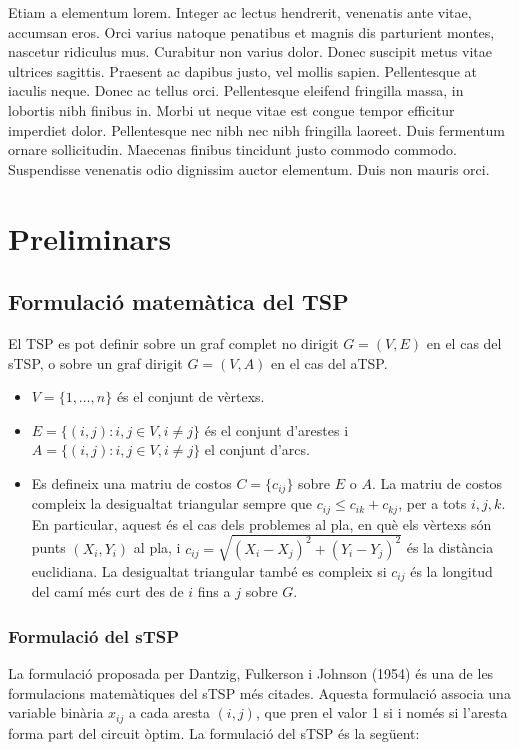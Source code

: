 \documentclass[a4paper,12pt,twoside]{ThesisStyle}
\begin{document}
Etiam a elementum lorem. Integer ac lectus hendrerit, venenatis ante vitae, accumsan eros. Orci varius natoque penatibus et magnis dis parturient montes, nascetur ridiculus mus. Curabitur non varius dolor. Donec suscipit metus vitae ultrices sagittis. Praesent ac dapibus justo, vel mollis sapien. Pellentesque at iaculis neque. Donec ac tellus orci. Pellentesque eleifend fringilla massa, in lobortis nibh finibus in. Morbi ut neque vitae est congue tempor efficitur imperdiet dolor. Pellentesque nec nibh nec nibh fringilla laoreet. Duis fermentum ornare sollicitudin. Maecenas finibus tincidunt justo commodo commodo. Suspendisse venenatis odio dignissim auctor elementum. Duis non mauris orci.



\chapter{Preliminars}
\label{cap:prelim}

\section{Formulació matemàtica del TSP}
\label{Formulacio}

El TSP es pot definir sobre un graf complet no dirigit \( G = (V, E) \) en el cas del sTSP, o sobre un graf dirigit \( G = (V, A) \) en el cas del aTSP.

\begin{itemize}
  \item \( V = \{1, \dots, n\} \) és el conjunt de vèrtexs.
  \item \( E = \{ (i,j) : i,j \in V, i \neq j \} \) és el conjunt d'arestes i \( A = \{ (i,j) : i,j \in V, i \neq j \} \) el conjunt d'arcs.
  \item Es defineix una matriu de costos \( C = \{c_{ij}\} \) sobre \( E \) o \( A \). La matriu de costos compleix la desigualtat triangular sempre que \( c_{ij} \leq c_{ik} + c_{kj} \), per a tots \( i, j, k \). En particular, aquest és el cas dels problemes al pla, en què els vèrtexs són punts \( (X_i, Y_i) \) al pla, i \( c_{ij} = \sqrt{(X_i - X_j)^2 + (Y_i - Y_j)^2} \) és la distància euclidiana. La desigualtat triangular també es compleix si \( c_{ij} \) és la longitud del camí més curt des de \( i \) fins a \( j \) sobre \( G \).
\end{itemize}

\subsection{Formulació del sTSP}
\label{FormulacioSTSP}
La formulació proposada per Dantzig, Fulkerson i Johnson (1954) és una de les formulacions matemàtiques del sTSP més citades. Aquesta formulació associa una variable binària \(x_{ij}\) a cada aresta \( (i,j) \), que pren el valor 1 si i només si l'aresta forma part del circuit òptim. La formulació del sTSP és la següent:
\end{document}
